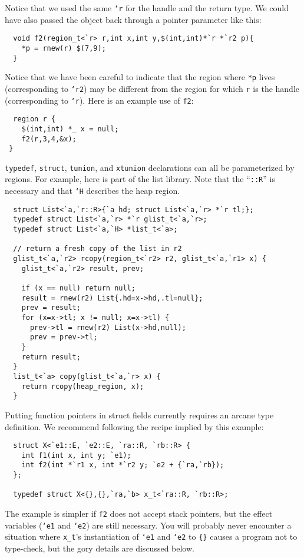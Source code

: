Notice that we used the same \texttt{`r} for the handle and the return
type.  We could have also passed the object back through a pointer
parameter like this:
\begin{verbatim}
  void f2(region_t<`r> r,int x,int y,$(int,int)*`r *`r2 p){ 
    *p = rnew(r) $(7,9); 
  }
\end{verbatim}

Notice that we have been careful to indicate that the region where
\texttt{*p} lives (corresponding to \texttt{`r2}) may be different from
the region for which \texttt{r} is the handle (corresponding to
\texttt{`r}).  Here is an example use of \texttt{f2}:
\begin{verbatim}
  region r { 
    $(int,int) *_ x = null; 
    f2(r,3,4,&x);
 }
\end{verbatim}

\texttt{typedef}, \texttt{struct}, \texttt{tunion}, and \texttt{xtunion}
declarations can all be parameterized by regions.  For example, here
is part of the list library.  Note that the ``\texttt{::R}'' is
necessary and that \texttt{`H} describes the heap region.
\begin{verbatim}
  struct List<`a,`r::R>{`a hd; struct List<`a,`r> *`r tl;};
  typedef struct List<`a,`r> *`r glist_t<`a,`r>;
  typedef struct List<`a,`H> *list_t<`a>;

  // return a fresh copy of the list in r2
  glist_t<`a,`r2> rcopy(region_t<`r2> r2, glist_t<`a,`r1> x) {
    glist_t<`a,`r2> result, prev;

    if (x == null) return null;
    result = rnew(r2) List{.hd=x->hd,.tl=null};
    prev = result;
    for (x=x->tl; x != null; x=x->tl) {
      prev->tl = rnew(r2) List(x->hd,null);
      prev = prev->tl;
    }
    return result;
  } 
  list_t<`a> copy(glist_t<`a,`r> x) {
    return rcopy(heap_region, x);
  }
\end{verbatim}

Putting function pointers in struct fields currently requires an
arcane type definition.  We recommend following the recipe implied by
this example:
\begin{verbatim}
  struct X<`e1::E, `e2::E, `ra::R, `rb::R> {
    int f1(int x, int y; `e1); 
    int f2(int *`r1 x, int *`r2 y; `e2 + {`ra,`rb});
  };

  typedef struct X<{},{},`ra,`b> x_t<`ra::R, `rb::R>;
\end{verbatim}

The example is simpler if \texttt{f2} does not accept stack pointers,
but the effect variables (\texttt{`e1} and \texttt{`e2}) are still
necessary.  You will probably never encounter a situation where
\texttt{x_t}'s instantiation of \texttt{`e1} and \texttt{`e2} to \verb|{}|
causes a program not to type-check, but the gory details are discussed
below.

